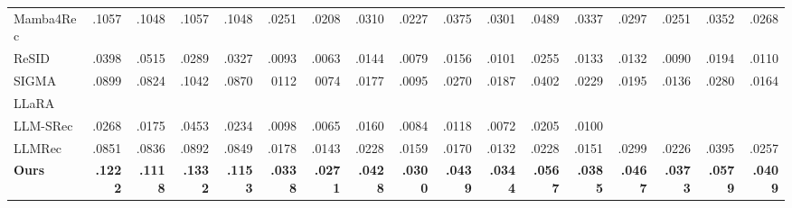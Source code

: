 \documentclass[11pt]{article}
\begin{document}
\begin{table}[t]
{\begin{tabular}{l*{4}{rrrr}}
        Mamba4Rec & .1057 & .1048 & .1057 & .1048 & .0251 & .0208 & .0310 & .0227 & .0375 & .0301 & .0489 & .0337 & .0297 & .0251 & .0352 & .0268 \\
        ReSID & .0398 & .0515 & .0289 & .0327 & .0093 & .0063 & .0144 & .0079 & .0156 & .0101 & .0255 & .0133 & .0132 & .0090 & .0194 & .0110 \\
        SIGMA & .0899 & .0824 & .1042 & .0870 & 0112 & 0074 & .0177 & .0095 & .0270 & .0187 & .0402 & .0229 & .0195 & .0136 & .0280 & .0164 \\
        LLaRA \\
        LLM-SRec &.0268 & .0175 & .0453 & .0234 & .0098 & .0065 & .0160 & .0084 & .0118 & .0072 & .0205 & .0100\\
        LLMRec & .0851 & .0836 & .0892 & .0849 & .0178 & .0143 & .0228 & .0159 & .0170 & .0132 & .0228 & .0151 & .0299 & .0226 & .0395 & .0257 \\
        \midrule
        \textbf{Ours} & \textbf{.1222} & \textbf{.1118} & \textbf{.1332} & \textbf{.1153} & \textbf{.0338} & \textbf{.0271} & \textbf{.0428} & \textbf{.0300} & \textbf{.0439} & \textbf{.0344} & \textbf{.0567} & \textbf{.0385} & \textbf{.0467} & \textbf{.0373} & \textbf{.0579} & \textbf{.0409} \\
        \bottomrule
    \end{tabular}%
    }
\end{table}
\end{document}
